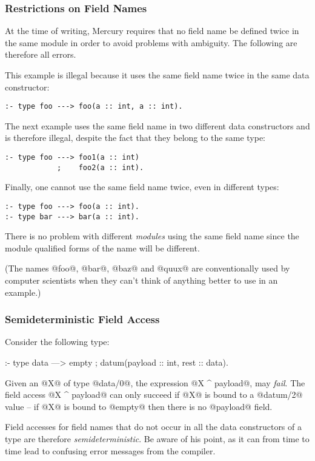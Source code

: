 \subsubsection{Restrictions on Field Names}

At the time of writing, Mercury requires that no field name be defined twice
in the same module in order to avoid problems with ambiguity.  The following
are therefore all errors.

This example is illegal because it uses the same field name twice in the
same data constructor:
\begin{verbatim}
:- type foo ---> foo(a :: int, a :: int).
\end{verbatim}
The next example uses the same field name in two different data
constructors and is therefore illegal, despite the fact that they belong to
the same type:
\begin{verbatim}
:- type foo ---> foo1(a :: int)
            ;    foo2(a :: int).
\end{verbatim}
Finally, one cannot use the same field name twice, even in different types:
\begin{verbatim}
:- type foo ---> foo(a :: int).
:- type bar ---> bar(a :: int).
\end{verbatim}
There is no problem with different \emph{modules} using the same field name
since the module qualified forms of the name will be different.

(The names @foo@, @bar@, @baz@ and @quux@ are conventionally used by
computer scientists when they can't think of anything better to use in an
example.)

\subsubsection{Semideterministic Field Access}

Consider the following type:
\begin{myverbatim}
:- type data ---> empty ; datum(payload :: int, rest :: data).
\end{myverbatim}
Given an @X@ of type @data/0@, the expression @X ^ payload@, may
\emph{fail}.  The field access @X ^ payload@ can only succeed if @X@ is
bound to a @datum/2@ value -- if @X@ is bound to @empty@ then there is no
@payload@ field.

Field accesses for field names that do not occur in all the data
constructors of a type are therefore \emph{semideterministic}.  Be aware of
his point, as it can from time to time lead to confusing error messages from
the compiler.

